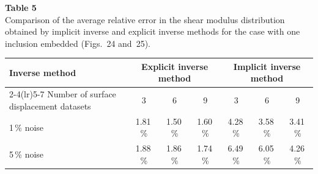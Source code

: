 \documentclass[11pt]{article}
\begin{document}
\noindent\textbf{Table 5}\\[0.2em]
{\small Comparison of the average relative error in the shear
modulus distribution obtained by implicit inverse and explicit
inverse methods for the case with one inclusion embedded
(Figs.~24 and~25).}
\vspace{0.3em}

\begin{center}
\small
\begin{tabular}{@{}l ccc ccc@{}}
\toprule
Inverse method
  & \multicolumn{3}{c}{Explicit inverse method}
  & \multicolumn{3}{c}{Implicit inverse method} \\
\cmidrule(lr){2-4}\cmidrule(lr){5-7}
Number of surface displacement datasets
  & 3 & 6 & 9 & 3 & 6 & 9 \\
\midrule
1\,\% noise & 1.81\,\% & 1.50\,\% & 1.60\,\% & 4.28\,\% & 3.58\,\% & 3.41\,\% \\
5\,\% noise & 1.88\,\% & 1.86\,\% & 1.74\,\% & 6.49\,\% & 6.05\,\% & 4.26\,\% \\
\bottomrule
\end{tabular}
\end{center}

\vspace{1em}
\end{document}
